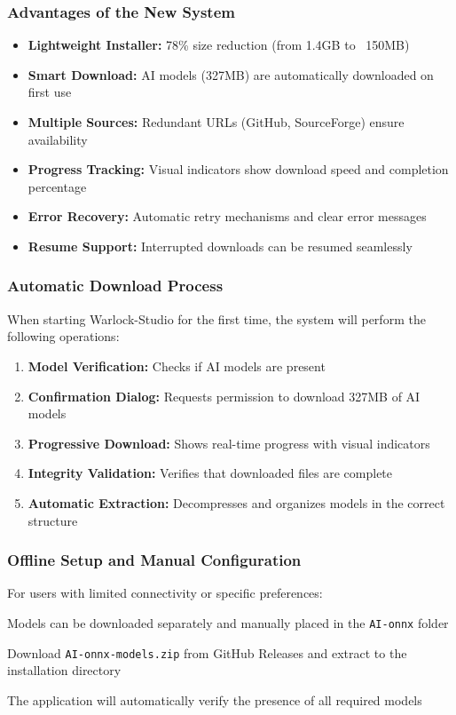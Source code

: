 \documentclass[11pt, a4paper]{article}
\begin{document}
\subsubsection{Advantages of the New System}
\begin{itemize}[leftmargin=*]
    \item \textbf{Lightweight Installer:} 78\% size reduction (from 1.4GB to ~150MB)
    \item \textbf{Smart Download:} AI models (327MB) are automatically downloaded on first use
    \item \textbf{Multiple Sources:} Redundant URLs (GitHub, SourceForge) ensure availability
    \item \textbf{Progress Tracking:} Visual indicators show download speed and completion percentage
    \item \textbf{Error Recovery:} Automatic retry mechanisms and clear error messages
    \item \textbf{Resume Support:} Interrupted downloads can be resumed seamlessly
\end{itemize}

\subsubsection{Automatic Download Process}
When starting Warlock-Studio for the first time, the system will perform the following operations:
\begin{enumerate}[leftmargin=*]
    \item \textbf{Model Verification:} Checks if AI models are present
    \item \textbf{Confirmation Dialog:} Requests permission to download 327MB of AI models
    \item \textbf{Progressive Download:} Shows real-time progress with visual indicators
    \item \textbf{Integrity Validation:} Verifies that downloaded files are complete
    \item \textbf{Automatic Extraction:} Decompresses and organizes models in the correct structure
\end{enumerate}

\subsubsection{Offline Setup and Manual Configuration}
For users with limited connectivity or specific preferences:
\begin{description}[leftmargin=*, style=nextline]
    \item[Offline Installation:] Models can be downloaded separately and manually placed in the \texttt{AI-onnx} folder
    \item[Manual Location:] Download \texttt{AI-onnx-models.zip} from GitHub Releases and extract to the installation directory
    \item[File Verification:] The application will automatically verify the presence of all required models
\end{description}
\end{document}
